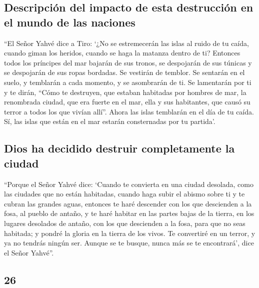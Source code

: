 \begin{paracol}{2}
\hypertarget{descripciuxf3n-del-impacto-de-esta-destrucciuxf3n-en-el-mundo-de-las-naciones}{%
\subsection{Descripción del impacto de esta destrucción en el mundo de
las
naciones}\label{descripciuxf3n-del-impacto-de-esta-destrucciuxf3n-en-el-mundo-de-las-naciones}}

 ``El Señor Yahvé dice a Tiro: `¿No se estremecerán las
islas al ruido de tu caída, cuando giman los heridos, cuando se haga la
matanza dentro de ti?  Entonces todos los príncipes del
mar bajarán de sus tronos, se despojarán de sus túnicas y se despojarán
de sus ropas bordadas. Se vestirán de temblor. Se sentarán en el suelo,
y temblarán a cada momento, y se asombrarán de ti.  Se
lamentarán por ti y te dirán, ``Cómo te destruyen, que estaban habitadas
por hombres de mar, la renombrada ciudad, que era fuerte en el mar, ella
y sus habitantes, que causó su terror a todos los que vivían allí''.
 Ahora las islas temblarán en el día de tu caída. Sí, las
islas que están en el mar estarán consternadas por tu partida'.

\hypertarget{dios-ha-decidido-destruir-completamente-la-ciudad}{%
\subsection{Dios ha decidido destruir completamente la
ciudad}\label{dios-ha-decidido-destruir-completamente-la-ciudad}}

 ``Porque el Señor Yahvé dice: `Cuando te convierta en
una ciudad desolada, como las ciudades que no están habitadas, cuando
haga subir el abismo sobre ti y te cubran las grandes aguas,
 entonces te haré descender con los que descienden a la
fosa, al pueblo de antaño, y te haré habitar en las partes bajas de la
tierra, en los lugares desolados de antaño, con los que descienden a la
fosa, para que no seas habitada; y pondré la gloria en la tierra de los
vivos.  Te convertiré en un terror, y ya no tendrás
ningún ser. Aunque se te busque, nunca más se te encontrará', dice el
Señor Yahvé''.

\switchcolumn
\begin{otherlanguage}{english}

\hypertarget{section-51}{%
\section{26}\label{section-51}}


\end{otherlanguage}
\end{paracol}

